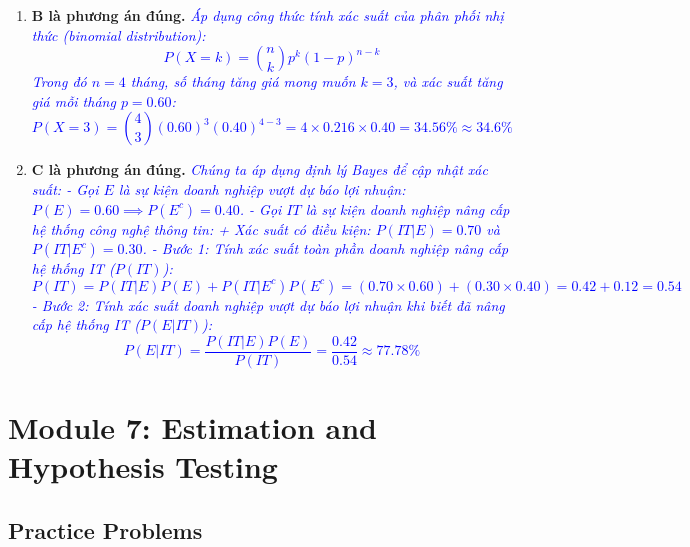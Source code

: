 \begin{enumerate}
	\item \textbf{B là phương án đúng.} \textcolor{blue}{\textit{Áp dụng công thức tính xác suất của phân phối nhị thức (binomial distribution):
	      \[
	      P(X = k) = \binom{n}{k} p^k (1-p)^{n-k}
	      \]
	      Trong đó $n = 4$ tháng, số tháng tăng giá mong muốn $k = 3$, và xác suất tăng giá mỗi tháng $p = 0.60$:
	      \[
	      P(X = 3) = \binom{4}{3} (0.60)^3 (0.40)^{4-3} = 4 \times 0.216 \times 0.40 = 34.56\% \approx 34.6\%
	      \]}}

	\item \textbf{C là phương án đúng.} \textcolor{blue}{\textit{Chúng ta áp dụng định lý Bayes để cập nhật xác suất:
	      - Gọi $E$ là sự kiện doanh nghiệp vượt dự báo lợi nhuận: $P(E) = 0.60 \implies P(E^c) = 0.40$.
	      - Gọi $IT$ là sự kiện doanh nghiệp nâng cấp hệ thống công nghệ thông tin:
	        + Xác suất có điều kiện: $P(IT|E) = 0.70$ và $P(IT|E^c) = 0.30$.
	      - Bước 1: Tính xác suất toàn phần doanh nghiệp nâng cấp hệ thống IT ($P(IT)$):
	        \[
	        P(IT) = P(IT|E)P(E) + P(IT|E^c)P(E^c) = (0.70 \times 0.60) + (0.30 \times 0.40) = 0.42 + 0.12 = 0.54
	        \]
	      - Bước 2: Tính xác suất doanh nghiệp vượt dự báo lợi nhuận khi biết đã nâng cấp hệ thống IT ($P(E|IT)$):
	        \[
	        P(E|IT) = \frac{P(IT|E)P(E)}{P(IT)} = \frac{0.42}{0.54} \approx 77.78\%
	        \]}}
\end{enumerate}

\newpage

\section{Module 7: Estimation and Hypothesis Testing}
\label{sec:app_Problems_M7}

\subsection{Practice Problems}
\label{subsec:app_Problems_M7}


